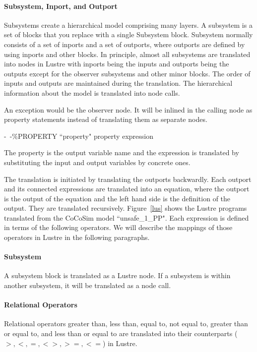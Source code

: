 \documentclass{article}
\begin{document}
\paragraph{Subsystem, Inport, and Outport} 
Subsystems create a hierarchical model comprising many layers. 
A subsystem is a set of blocks that you replace with a single \textsf{Subsystem} block. 
Subsystem normally consists of a set of inports and a set of outports, where outports are
defined by using inports and other blocks. 
In principle, almost all subsystems are translated into nodes in Lustre with inports being the 
inputs and outports being the outputs except for the observer subsystems and other minor blocks. 
The order of inputs and outputs are maintained during the translation. 
The hierarchical information about the model is translated into node calls.

An exception would be the observer node.
It will be inlined in the calling node as property statements instead of translating them 
as separate nodes.

\*

\indent \indent \indent \indent \textsf{-\ -\%PROPERTY ``property" property expression}

\*


\noindent The \textsf{property} is the output variable name and the expression is translated 
by substituting the input and output variables by concrete ones.

The translation is initiated by translating the outports backwardly. 
Each outport and its connected expressions are translated into an equation, where the outport is the output of the equation 
and the left hand side is the definition of the output.
They are translated recursively.
Figure~\ref{lus} shows the Lustre programs translated from the CoCoSim model ``unsafe\_1\_PP".
Each expression is defined in terms of the following operators. 
We will describe the mappings of those operators in Lustre in the following paragraphs.

\paragraph{Subsystem} 
A subsystem block is translated as a Lustre node. If a subsystem is within another subsystem, it will be translated as a node call.


\paragraph{Relational Operators} 
Relational operators greater than, less than, equal to, not equal to, greater 
than or equal to, and less than or equal to are translated into their counterparts 
($>, <, =, <>, >=, <=$) in Lustre.
\end{document}
